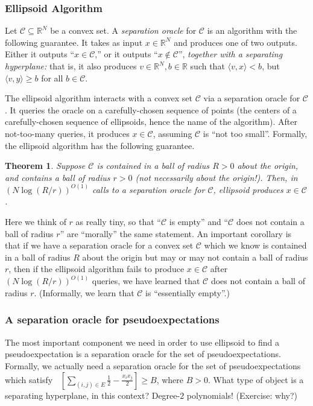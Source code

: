 \documentclass[11pt]{article}
\newtheorem{theorem}{Theorem}
\newcommand{\brac}[1]{\left[ #1 \right]}
\newcommand{\iprod}[1]{\langle #1 \rangle}
\newcommand{\R}{\mathbb{R}} %
\newcommand{\cC}{\mathcal{C}}
\DeclareMathOperator{\pE}{\widetilde{\mathbb{E}}} %
\begin{document}
\subsubsection{Ellipsoid Algorithm}
Let $\cC \subseteq \R^N$ be a convex set.
A \emph{separation oracle} for $\cC$ is an algorithm with the following guarantee.
It takes as input $x \in \R^N$ and produces one of two outputs.
Either it outputs ``$x \in \cC$,'' or it outputs ``$x \notin \cC$'', \emph{together with a separating hyperplane:} that is, it also produces $v \in \R^N, b \in \R$ such that $\iprod{v,x} < b$, but $\iprod{v,y} \geq b$ for all $b \in \cC$.

The ellipsoid algorithm interacts with a convex set $\cC$ via a separation oracle for $\cC$.
It queries the oracle on a carefully-chosen sequence of points (the centers of a carefully-chosen sequence of ellipsoids, hence the name of the algorithm).
After not-too-many queries, it produces $x \in \cC$, assuming $\cC$ is ``not too small''.
Formally, the ellipsoid algorithm has the following guarantee.

\begin{theorem}
Suppose $\cC$ is contained in a ball of radius $R > 0$ about the origin, and contains a ball of radius $r > 0$ (not necessarily about the origin!).
Then, in $(N \log (R/r))^{O(1)}$ calls to a separation oracle for $\cC$, ellipsoid produces $x \in \cC$.
\end{theorem}
Here we think of $r$ as really tiny, so that ``$\cC$ is empty'' and ``$\cC$ does not contain a ball of radius $r$'' are ``morally'' the same statement.
An important corollary is that if we have a separation oracle for a convex set $\cC$ which we know is contained in a ball of radius $R$ about the origin but may or may not contain a ball of radius $r$, then if the ellipsoid algorithm fails to produce $x \in \cC$ after $(N \log (R/r))^{O(1)}$ queries, we have learned that $\cC$ does not contain a ball of radius $r$.
(Informally, we learn that $\cC$ is ``essentially empty''.)

\subsubsection{A separation oracle for pseudoexpectations}
The most important component we need in order to use ellipsoid to find a pseudoexpectation is a separation oracle for the set of pseudoexpectations.
Formally, we actually need a separation oracle for the set of pseudoexpectations which satisfy
$\pE \brac{ \sum_{(i,j) \in E} \frac 12 - \frac{x_i x_j}{2}} \geq B$, where $B > 0$.
What type of object is a separating hyperplane, in this context?
Degree-$2$ polynomials!
(Exercise: why?)
\end{document}

